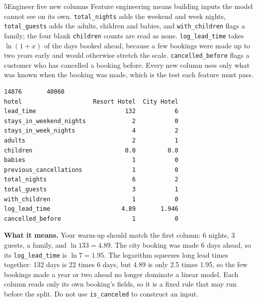 \begin{labquestion}{5}{Engineer five new columns}
Feature engineering means building inputs the model cannot see on its own. \texttt{total\_nights} adds the weekend and week nights, \texttt{total\_guests} adds the adults, children and babies, and \texttt{with\_children} flags a family; the four blank \texttt{children} counts are read as none. \texttt{log\_lead\_time} takes $\ln(1+x)$ of the days booked ahead, because a few bookings were made up to two years early and would otherwise stretch the scale. \texttt{cancelled\_before} flags a customer who has cancelled a booking before. Every new column uses only what was known when the booking was made, which is the test each feature must pass.
\end{labquestion}
\begin{labanswer}


\begin{refoutput}
\begin{lstlisting}[style=utpterminal]
                                14876       40060
hotel                    Resort Hotel  City Hotel
lead_time                         132           6
stays_in_weekend_nights             2           0
stays_in_week_nights                4           2
adults                              2           1
children                          0.0         0.0
babies                              1           0
previous_cancellations              1           0
total_nights                        6           2
total_guests                        3           1
with_children                       1           0
log_lead_time                    4.89       1.946
cancelled_before                    1           0
\end{lstlisting}
\end{refoutput}

\textbf{What it means.} Your warm-up should match the first column: 6 nights, 3 guests, a family, and $\ln 133 = 4.89$. The city booking was made 6 days ahead, so its \texttt{log\_lead\_time} is $\ln 7 = 1.95$. The logarithm squeezes long lead times together: 132 days is 22 times 6 days, but 4.89 is only 2.5 times 1.95, so the few bookings made a year or two ahead no longer dominate a linear model. Each column reads only its own booking's fields, so it is a fixed rule that may run before the split. Do not use \texttt{is\_canceled} to construct an input.
\end{labanswer}


